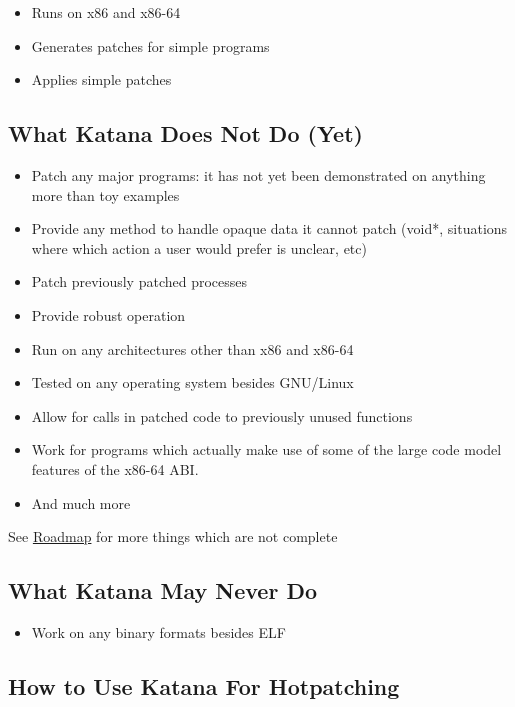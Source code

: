 \documentclass[11pt]{article}
\begin{document}
\begin{itemize}
\item Runs on x86 and x86-64
\item Generates patches for simple programs
\item Applies simple patches
\end{itemize}
\subsection{What Katana Does Not Do (Yet)}
\label{sec-3.3}

\begin{itemize}
\item Patch any major programs: it has not yet been demonstrated on
     anything more than toy examples
\item Provide any method to handle opaque data it cannot patch (void*,
     situations where which action a user would prefer is unclear, etc)
\item Patch previously patched processes
\item Provide robust operation
\item Run on any architectures other than x86 and x86-64
\item Tested on any operating system besides GNU/Linux
\item Allow for calls in patched code to previously unused functions
\item Work for programs which actually make use of some of the large
     code model features of the x86-64 ABI.
\item And much more
\end{itemize}
   See \hyperref[sec-3.14]{Roadmap} for more things which are not complete

\subsection{What Katana May Never Do}
\label{sec-3.4}

\begin{itemize}
\item Work on any binary formats besides ELF
\end{itemize}
\subsection{How to Use Katana For Hotpatching}
\label{sec-3.5}
\end{document}
